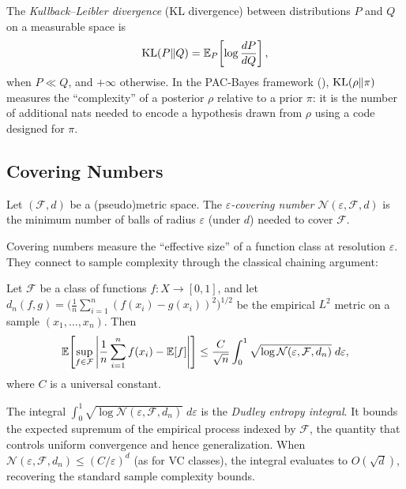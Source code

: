 \begin{defn}[KL Complexity]
\label{def:kl-complexity}
The \emph{Kullback--Leibler divergence} (KL divergence) between distributions
$P$ and $Q$ on a measurable space is
\[
  \mathrm{KL}(P \| Q) = \mathbb{E}_P\!\left[\log\frac{dP}{dQ}\right],
\]
when $P \ll Q$, and $+\infty$ otherwise.  In the PAC-Bayes framework
(), $\mathrm{KL}(\rho \| \pi)$ measures the ``complexity'' of a
posterior $\rho$ relative to a prior $\pi$: it is the number of additional
nats needed to encode a hypothesis drawn from $\rho$ using a code designed for
$\pi$.
\end{defn}

\subsection{Covering Numbers}

\begin{defn}
\label{def:covering-number}
Let $(\mathcal{F}, d)$ be a (pseudo)metric space.  The \emph{$\varepsilon$-covering
number} $\mathcal{N}(\varepsilon, \mathcal{F}, d)$ is the minimum number of
balls of radius $\varepsilon$ (under $d$) needed to cover $\mathcal{F}$.
\end{defn}

Covering numbers measure the ``effective size'' of a function class at
resolution $\varepsilon$.  They connect to sample complexity through the
classical chaining argument:

\begin{thm}
\label{thm:dudley}
Let $\mathcal{F}$ be a class of functions $f \colon X \to [0,1]$, and let
$d_n(f,g) = \bigl(\frac{1}{n}\sum_{i=1}^n (f(x_i) - g(x_i))^2\bigr)^{1/2}$
be the empirical $L^2$ metric on a sample $(x_1, \ldots, x_n)$.  Then
\[
  \mathbb{E}\!\left[\sup_{f \in \mathcal{F}} \left|\frac{1}{n}\sum_{i=1}^n f(x_i)
    - \mathbb{E}[f]\right|\right]
  \leq \frac{C}{\sqrt{n}} \int_0^1
    \sqrt{\log \mathcal{N}(\varepsilon, \mathcal{F}, d_n)}\; d\varepsilon,
\]
where $C$ is a universal constant.
\end{thm}

The integral $\int_0^1 \sqrt{\log \mathcal{N}(\varepsilon, \mathcal{F}, d_n)}\;
d\varepsilon$ is the \emph{Dudley entropy integral}.  It bounds the expected
supremum of the empirical process indexed by $\mathcal{F}$, the quantity that
controls uniform convergence and hence generalization.  When
$\mathcal{N}(\varepsilon, \mathcal{F}, d_n) \leq (C/\varepsilon)^d$ (as for
VC classes), the integral evaluates to $O(\sqrt{d})$, recovering the standard
sample complexity bounds.


